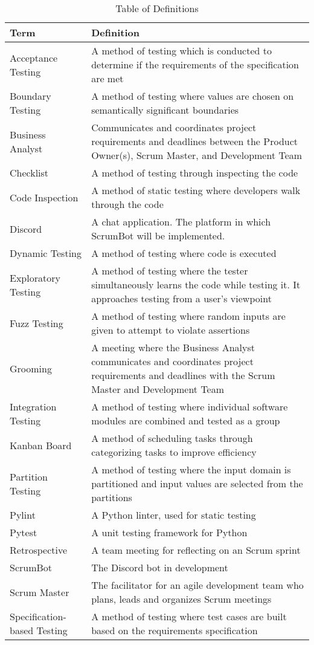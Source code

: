 \documentclass[12pt, titlepage]{article}
\begin{document}
\begin{table}[H]
    \caption{Table of Definitions}
    \label{Table}
    \begin{tabularx}{\textwidth}{p{4cm}X}
        \toprule
        \textbf{Term} & \textbf{Definition}\\
        \midrule
        Acceptance Testing & A method of testing which is conducted to determine if the requirements of the specification are met\\
        Boundary Testing & A method of testing where values are chosen on semantically significant boundaries\\
        Business Analyst & Communicates and coordinates project requirements and deadlines between the Product Owner(s), Scrum Master, and Development Team\\
        Checklist & A method of testing through inspecting the code\\
        Code Inspection & A method of static testing where developers walk through the code\\
        Discord & A chat application. The platform in which ScrumBot will be implemented.\\
        Dynamic Testing & A method of testing where code is executed\\
        Exploratory Testing & A method of testing where the tester simultaneously learns the code while testing it. It approaches testing from a user's viewpoint\\
        Fuzz Testing & A method of testing where random inputs are given to attempt to violate assertions\\
        Grooming & A meeting where the Business Analyst communicates and coordinates project requirements and deadlines with the Scrum Master and Development Team\\
        Integration Testing & A method of testing where individual software modules are combined and tested as a group\\
        Kanban Board & A method of scheduling tasks through categorizing tasks to improve efficiency\\
        Partition Testing & A method of testing where the input domain is partitioned and input values are selected from the partitions\\
        Pylint & A Python linter, used for static testing\\
        Pytest & A unit testing framework for Python\\
        Retrospective & A team meeting for reflecting on an Scrum sprint\\
        ScrumBot & The Discord bot in development\\
        Scrum Master & The facilitator for an agile development team who plans, leads and organizes Scrum meetings\\
        Specification-based Testing & A method of testing where test cases are built based on the requirements specification\\
        \bottomrule
    \end{tabularx}
\end{table} 
\end{document}
